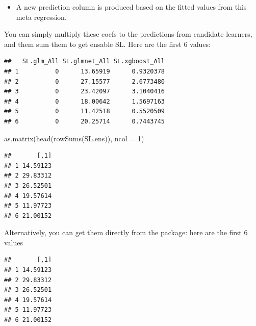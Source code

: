 \documentclass[
]{book}
\newenvironment{Shaded}{\begin{snugshade}}{\end{snugshade}}
\newcommand{\AttributeTok}[1]{\textcolor[rgb]{0.77,0.63,0.00}{#1}}
\newcommand{\DecValTok}[1]{\textcolor[rgb]{0.00,0.00,0.81}{#1}}
\newcommand{\FunctionTok}[1]{\textcolor[rgb]{0.00,0.00,0.00}{#1}}
\newcommand{\NormalTok}[1]{#1}
\newcommand{\OtherTok}[1]{\textcolor[rgb]{0.56,0.35,0.01}{#1}}
\newcommand{\SpecialCharTok}[1]{\textcolor[rgb]{0.00,0.00,0.00}{#1}}
\providecommand{\tightlist}{%
  \setlength{\itemsep}{0pt}\setlength{\parskip}{0pt}}
\begin{document}
\begin{itemize}
\tightlist
\item
  A new prediction column is produced based on the fitted values from this meta regression.
\end{itemize}

You can simply multiply these coefs to the predictions from candidate learners, and them sum them to get ensable SL. Here are the first 6 values:

\begin{Shaded}
\end{Shaded}

\begin{verbatim}
##   SL.glm_All SL.glmnet_All SL.xgboost_All
## 1          0      13.65919      0.9320378
## 2          0      27.15577      2.6773480
## 3          0      23.42097      3.1040416
## 4          0      18.00642      1.5697163
## 5          0      11.42518      0.5520509
## 6          0      20.25714      0.7443745
\end{verbatim}

\begin{Shaded}
\begin{Highlighting}[]
\FunctionTok{as.matrix}\NormalTok{(}\FunctionTok{head}\NormalTok{(}\FunctionTok{rowSums}\NormalTok{(SL.ens)), }\AttributeTok{ncol =} \DecValTok{1}\NormalTok{)}
\end{Highlighting}
\end{Shaded}

\begin{verbatim}
##       [,1]
## 1 14.59123
## 2 29.83312
## 3 26.52501
## 4 19.57614
## 5 11.97723
## 6 21.00152
\end{verbatim}

Alternatively, you can get them directly from the package: here are the first 6 values

\begin{Shaded}
\end{Shaded}

\begin{verbatim}
##       [,1]
## 1 14.59123
## 2 29.83312
## 3 26.52501
## 4 19.57614
## 5 11.97723
## 6 21.00152
\end{verbatim}
\end{document}
